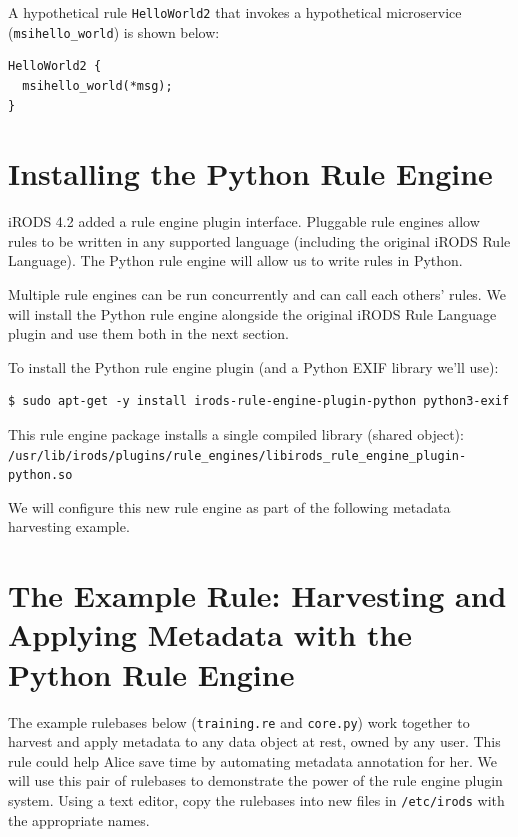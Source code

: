 \documentclass[10pt,oneside]{memoir}
\begin{document}
A hypothetical rule \texttt{HelloWorld2} that invokes a hypothetical microservice (\texttt{msihello\_world}) is shown below:

\begin{lstlisting}
HelloWorld2 {
  msihello_world(*msg);
}
\end{lstlisting}


\section{Installing the Python Rule Engine}

iRODS 4.2 added a rule engine plugin interface.  Pluggable rule engines allow rules to be written in any supported language (including the original iRODS Rule Language).  The Python rule engine will allow us to write rules in Python.

Multiple rule engines can be run concurrently and can call each others' rules.  We will install the Python rule engine alongside the original iRODS Rule Language plugin and use them both in the next section.

To install the Python rule engine plugin (and a Python EXIF library we'll use):

\begin{lstlisting}
$ sudo apt-get -y install irods-rule-engine-plugin-python python3-exif
\end{lstlisting}

This rule engine package installs a single compiled library (shared object): \\ \texttt{/usr/lib/irods/plugins/rule\_engines/libirods\_rule\_engine\_plugin-python.so}

We will configure this new rule engine as part of the following metadata harvesting example.

\section{The Example Rule: Harvesting and Applying Metadata with the Python Rule Engine}

The example rulebases below (\texttt{training.re} and \texttt{core.py}) work together to harvest and apply metadata to any data object at rest, owned by any user. This rule could help Alice save time by automating metadata annotation for her. We will use this pair of rulebases to demonstrate the power of the rule engine plugin system. Using a text editor, copy the rulebases into new files in \texttt{/etc/irods} with the appropriate names.
\end{document}
